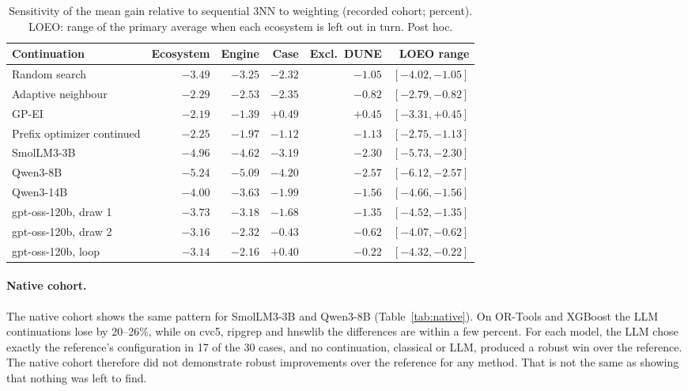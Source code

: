 \begin{table}[t]
\centering
\caption{Sensitivity of the mean gain relative to sequential 3NN to weighting (recorded cohort; percent). LOEO: range of the primary average when each ecosystem is left out in turn. Post hoc.}
\label{tab:weights}
\small
\begin{tabular}{lrrrrr}
\toprule
Continuation & Ecosystem & Engine & Case & Excl.\ DUNE & LOEO range \\
\midrule
Random search & $-3.49$ & $-3.25$ & $-2.32$ & $-1.05$ & $[-4.02, -1.05]$ \\
Adaptive neighbour & $-2.29$ & $-2.53$ & $-2.35$ & $-0.82$ & $[-2.79, -0.82]$ \\
GP-EI & $-2.19$ & $-1.39$ & $+0.49$ & $+0.45$ & $[-3.31, +0.45]$ \\
Prefix optimizer continued & $-2.25$ & $-1.97$ & $-1.12$ & $-1.13$ & $[-2.75, -1.13]$ \\
\midrule
SmolLM3-3B & $-4.96$ & $-4.62$ & $-3.19$ & $-2.30$ & $[-5.73, -2.30]$ \\
Qwen3-8B & $-5.24$ & $-5.09$ & $-4.20$ & $-2.57$ & $[-6.12, -2.57]$ \\
Qwen3-14B & $-4.00$ & $-3.63$ & $-1.99$ & $-1.56$ & $[-4.66, -1.56]$ \\
gpt-oss-120b, draw 1 & $-3.73$ & $-3.18$ & $-1.68$ & $-1.35$ & $[-4.52, -1.35]$ \\
gpt-oss-120b, draw 2 & $-3.16$ & $-2.32$ & $-0.43$ & $-0.62$ & $[-4.07, -0.62]$ \\
gpt-oss-120b, loop & $-3.14$ & $-2.16$ & $+0.40$ & $-0.22$ & $[-4.32, -0.22]$ \\
\bottomrule
\end{tabular}
\end{table}

\paragraph{Native cohort.} The native cohort shows the same pattern for SmolLM3-3B and Qwen3-8B (Table~\ref{tab:native}). On OR-Tools and XGBoost the LLM continuations lose by 20--26\%, while on cvc5, ripgrep and hnswlib the differences are within a few percent. For each model, the LLM chose exactly the reference's configuration in 17 of the 30 cases, and no continuation, classical or LLM, produced a robust win over the reference. The native cohort therefore did not demonstrate robust improvements over the reference for any method. That is not the same as showing that nothing was left to find.

